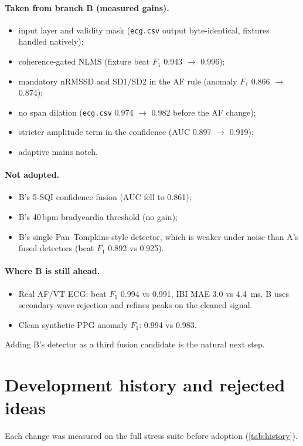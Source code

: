 \documentclass[10pt,a4paper]{article}
\newcommand{\code}[1]{\texttt{#1}}
\begin{document}
\paragraph{Taken from branch B (measured gains).}
\begin{itemize}
  \item input layer and validity mask (\code{ecg.csv} output byte-identical, fixtures handled natively);
  \item coherence-gated NLMS (fixture beat $F_1$ 0.943 $\to$ 0.996);
  \item mandatory nRMSSD and SD1/SD2 in the AF rule (anomaly $F_1$ 0.866 $\to$ 0.874);
  \item no span dilation (\code{ecg.csv} 0.974 $\to$ 0.982 before the AF change);
  \item stricter amplitude term in the confidence (AUC 0.897 $\to$ 0.919);
  \item adaptive mains notch.
\end{itemize}

\paragraph{Not adopted.}
\begin{itemize}
  \item B's 5-SQI confidence fusion (AUC fell to 0.861);
  \item B's 40\,bpm bradycardia threshold (no gain);
  \item B's single Pan--Tompkins-style detector, which is weaker under noise than A's fused detectors
        (beat $F_1$ 0.892 vs 0.925).
\end{itemize}

\paragraph{Where B is still ahead.}
\begin{itemize}
  \item Real AF/VT ECG: beat $F_1$ 0.994 vs 0.991, IBI MAE 3.0 vs \SI{4.4}{ms}. B uses secondary-wave rejection and
        refines peaks on the cleaned signal.
  \item Clean synthetic-PPG anomaly $F_1$: 0.994 vs 0.983.
\end{itemize}
Adding B's detector as a third fusion candidate is the natural next step.

\section{Development history and rejected ideas}
Each change was measured on the full stress suite before adoption (\cref{tab:history}).
\end{document}
